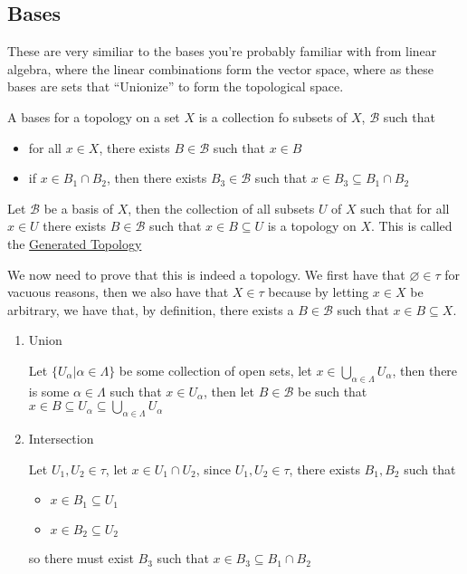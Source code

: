 \subsection{Bases}
These are very similiar to the bases you're probably familiar with from linear algebra, where the linear combinations form the vector space, where as these bases are sets that ``Unionize'' to form the topological space.
\begin{definition}[Bases]
    A bases for a topology on a set $X$ is a collection fo subsets of $X$, $\mathscr{B}$ such that
    \begin{itemize}
        \item for all $x\in X$, there exists $B\in\mathscr{B}$ such that $x\in B$
        \item if $x\in B_1\cap B_2$, then there exists $B_3\in\mathscr{B}$ such that $x\in B_3\subseteq B_1\cap B_2$
    \end{itemize}
\end{definition}
\begin{lemma}
    Let $\mathscr{B}$ be a basis of $X$, then the collection of all subsets $U$ of $X$ such that for all $x\in U$ there exists $B\in\mathscr{B}$ such that $x\in B\subseteq U$ is a topology on $X$. This is called the \href{https://proofwiki.org/wiki/Definition:Generated_Topology#:~:text=Definition%202-,The%20topology%20generated%20by%20S%2C%20denoted%20%CF%84(S)%2C,element%20of%20S%20is%20open.}{Generated Topology}    
\end{lemma}
We now need to prove that this is indeed a topology. We first have that $\varnothing\in\tau$ for vacuous reasons, then we also have that $X\in\tau$ because by letting $x\in X$ be arbitrary, we have that, by definition, there exists a $B\in\mathscr{B}$ such that $x\in B\subseteq X$.
\begin{enumerate}
    \item Union
    
    Let $\{U_\alpha\vert\alpha\in\Lambda\}$ be some collection of open sets, let $x\in\bigcup_{\alpha\in\Lambda}U_\alpha$, then there is some $\alpha\in\Lambda$ such that $x\in U_\alpha$, then let $B\in\mathscr{B}$ be such that $x\in B\subseteq U_\alpha\subseteq \bigcup_{\alpha\in\Lambda}U_\alpha$

    \item Intersection
    
    Let $U_1,U_2\in\tau$, let $x\in U_1\cap U_2$, since $U_1,U_2\in\tau$, there exists $B_1,B_2$ such that
    \begin{itemize}
        \item $x\in B_1\subseteq U_1$
        \item $x\in B_2\subseteq U_2$
    \end{itemize}
    so there must exist $B_3$ such that $x\in B_3\subseteq B_1\cap B_2$
\end{enumerate}
